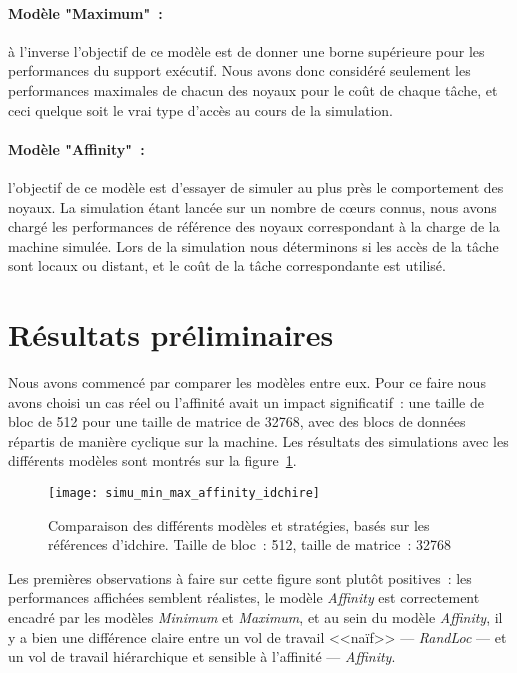 \paragraph{Modèle "Maximum"~:} à l'inverse l'objectif de ce modèle est de donner une borne supérieure pour les performances du support exécutif.
Nous avons donc considéré seulement les performances maximales de chacun des noyaux pour le coût de chaque tâche, et ceci quelque soit le vrai type d'accès au cours de la simulation.

\paragraph{Modèle "Affinity"~:} l'objectif de ce modèle est d'essayer de simuler au plus près le comportement des noyaux.
La simulation étant lancée sur un nombre de cœurs connus, nous avons chargé les performances de référence des noyaux correspondant à la charge de la machine simulée.
Lors de la simulation nous déterminons si les accès de la tâche sont locaux ou distant, et le coût de la tâche correspondante est utilisé.




\section{Résultats préliminaires}\label{sec:simulation:resultats}


Nous avons commencé par comparer les modèles entre eux.
Pour ce faire nous avons choisi un cas réel ou l'affinité avait un impact significatif~: une taille de bloc de 512 pour une taille de matrice de 32768, avec des blocs de données répartis de manière cyclique sur la machine.
Les résultats des simulations avec les différents modèles sont montrés sur la figure~\ref{fig:simu:modeles:idchire}.

\begin{figure}[h!]
  \centering
  \texttt{[image: simu\_min\_max\_affinity\_idchire]}
  \caption{Comparaison des différents modèles et stratégies, basés sur les références d'idchire. Taille de bloc~: 512, taille de matrice~: 32768}\label{fig:simu:modeles:idchire}
\end{figure}


Les premières observations à faire sur cette figure sont plutôt positives~: les performances affichées semblent réalistes, le modèle \emph{Affinity} est correctement encadré par les modèles \emph{Minimum} et \emph{Maximum}, et au sein du modèle \emph{Affinity}, il y a bien une différence claire entre un vol de travail <<naïf>> --- \emph{RandLoc} --- et un vol de travail hiérarchique et sensible à l'affinité --- \emph{Affinity}.


